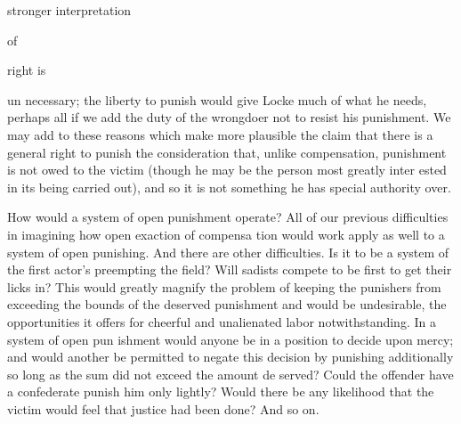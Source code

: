 \documentclass[11pt,openany]{book}
\begin{document}
stronger interpretation 

of 

right is 

un necessary; the liberty to punish would give Locke much of what he needs, perhaps all if we add the duty of the wrongdoer not to resist his punishment. We may add to these reasons which make more plausible the claim that there is a general right to punish the consideration that, unlike compensation, punishment is not owed to the victim (though he may be the person most greatly inter ested in its being carried out), and so it is not something he has special authority over. 

How would a system of open punishment operate? All of our previous difficulties in imagining how open exaction of compensa tion would work apply as well to a system of open punishing. And there are other difficulties. Is it to be a system of the first actor's preempting the field? Will sadists compete to be first to get their licks in? This would greatly magnify the problem of keeping the punishers from exceeding the bounds of the deserved punishment and would be undesirable, the opportunities it offers for cheerful and unalienated labor notwithstanding. In a system of open pun ishment would anyone be in a position to decide upon mercy; and would another be permitted to negate this decision by punishing additionally so long as the sum did not exceed the amount de served? Could the offender have a confederate punish him only lightly? Would there be any likelihood that the victim would feel that justice had been done? And so on. 
\end{document}
